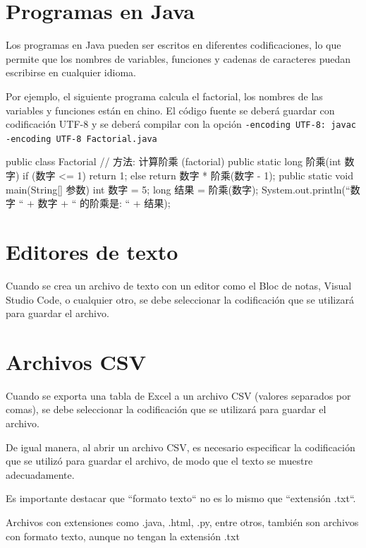 \section{Programas en Java}

Los programas en Java pueden ser escritos en diferentes codificaciones, lo que permite que los nombres de variables, funciones y cadenas de caracteres puedan escribirse en cualquier idioma.

Por ejemplo, el siguiente programa calcula el factorial, los nombres de las variables y funciones están en chino. El código fuente se deberá guardar con codificación UTF-8 y se deberá compilar con la opción \texttt{-encoding UTF-8: javac -encoding UTF-8 Factorial.java}

\begin{SourceCode}
public class Factorial
{
    // 方法: 计算阶乘 (factorial)
    public static long 阶乘(int 数字)
    {
        if (数字 <= 1)
            return 1;
        else
            return 数字 * 阶乘(数字 - 1);
    }
    public static void main(String[] 参数)
    {
        int 数字 = 5;
        long 结果 = 阶乘(数字);
        System.out.println(``数字 `` + 数字 + `` 的阶乘是: `` + 结果);
    }
}
\end{SourceCode}

\section{Editores de texto}

Cuando se crea un archivo de texto con un editor como el Bloc de notas, Visual Studio Code, o cualquier otro, se debe seleccionar la codificación que se utilizará para guardar el archivo.

\section{Archivos CSV}

Cuando se exporta una tabla de Excel a un archivo CSV (valores separados por comas), se debe seleccionar la codificación que se utilizará para guardar el archivo.

De igual manera, al abrir un archivo CSV, es necesario especificar la codificación que se utilizó para guardar el archivo, de modo que el texto se muestre adecuadamente.

Es importante destacar que ``formato texto`` no es lo mismo que ``extensión .txt``.

Archivos con extensiones como .java, .html, .py, entre otros, también son archivos con formato texto, aunque no tengan la extensión .txt

